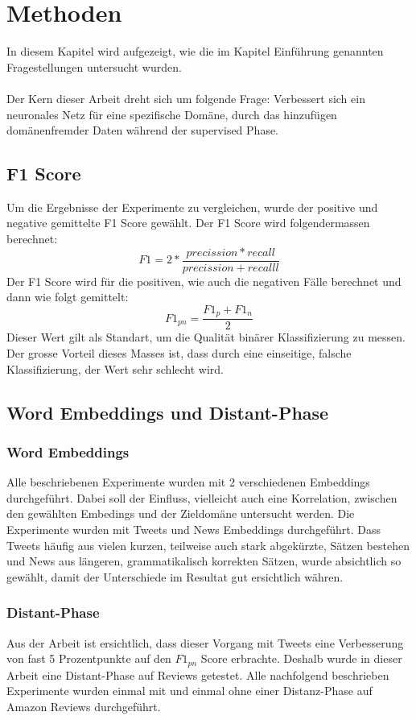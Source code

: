 \chapter{Methoden}
In diesem Kapitel wird aufgezeigt, wie die im Kapitel Einführung genannten Fragestellungen untersucht wurden.\\\\
Der Kern dieser Arbeit dreht sich um folgende Frage: Verbessert sich ein neuronales Netz für eine spezifische Domäne, durch das hinzufügen domänenfremder Daten während der supervised Phase.
\section{F1 Score}
Um die Ergebnisse der Experimente zu vergleichen, wurde der positive und negative gemittelte F1 Score gewählt.
Der F1 Score wird folgendermassen berechnet:
\begin{equation}
F1 = 2*\frac{precission*recall}{precission+recalll}
\end{equation}
Der F1 Score wird für die positiven, wie auch die negativen Fälle berechnet und dann wie folgt gemittelt:
\begin{equation}
F1_{pn} = \frac{F1_p+F1_n}{2}
\end{equation}
Dieser Wert gilt als Standart, um die Qualität binärer Klassifizierung zu messen. Der grosse Vorteil dieses Masses ist, dass durch eine einseitige, falsche Klassifizierung, der Wert sehr schlecht wird.
\section{Word Embeddings und Distant-Phase}
\subsection{Word Embeddings}
Alle beschriebenen Experimente wurden mit 2 verschiedenen Embeddings durchgeführt. Dabei soll der Einfluss, vielleicht auch eine Korrelation, zwischen den gewählten Embedings und der Zieldomäne untersucht werden. Die Experimente wurden mit Tweets und News Embeddings durchgeführt. Dass Tweets häufig aus vielen kurzen, teilweise auch stark abgekürzte, Sätzen bestehen und News aus längeren, grammatikalisch korrekten Sätzen, wurde absichtlich so gewählt, damit der Unterschiede im Resultat gut ersichtlich währen.
\subsection{Distant-Phase}
Aus der Arbeit \cite{DeriuMasterThesis} ist ersichtlich, dass dieser Vorgang mit Tweets eine Verbesserung von fast 5 Prozentpunkte auf den $F1_{pn}$ Score erbrachte.
Deshalb wurde in dieser Arbeit eine Distant-Phase auf Reviews getestet. Alle nachfolgend beschrieben Experimente wurden einmal mit und einmal ohne einer Distanz-Phase auf Amazon Reviews durchgeführt.

